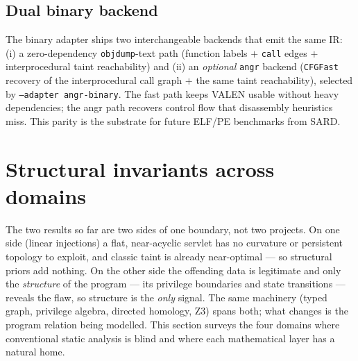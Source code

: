 \documentclass[11pt]{article}
\begin{document}
\subsection{Dual binary backend}
The binary adapter ships two interchangeable backends that emit the same IR:
(i) a zero-dependency \texttt{objdump}-text path (function labels $+$ \texttt{call}
edges $+$ interprocedural taint reachability) and (ii) an \emph{optional}
\texttt{angr} backend (\texttt{CFGFast} recovery of the interprocedural call graph
$+$ the same taint reachability), selected by \texttt{--adapter angr-binary}. The
fast path keeps VALEN usable without heavy dependencies; the angr path
recovers control flow that disassembly heuristics miss. This parity is the
substrate for future ELF/PE benchmarks from SARD.

\section{Structural invariants across domains}
The two results so far are two sides of one boundary, not two projects. On one
side (linear injections) a flat, near-acyclic servlet has no curvature or
persistent topology to exploit, and classic taint is already near-optimal --- so
structural priors add nothing. On the other side the offending data is
legitimate and only the \emph{structure} of the program --- its privilege
boundaries and state transitions --- reveals the flaw, so structure is the
\emph{only} signal. The same machinery (typed graph, privilege algebra, directed
homology, Z3) spans both; what changes is the program relation being modelled.
This section surveys the four domains where conventional static analysis is
blind and where each mathematical layer has a natural home.
\end{document}
